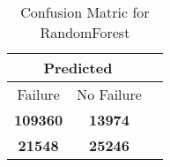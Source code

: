 \begin{table}[] 
\label{Table: Prediction Accuracy-DMDRandomForestOnlySunEKF-resetReflection-Reflection} 
\caption{Confusion Matric for RandomForest} 
\centering 
\begin{tabular} 
 {@{}ccc@{}} 
\toprule 
\multicolumn{2}{c}{\textbf{Predicted}}
 \\ \midrule 
\multicolumn{1}{|c|}{Failure} & 
\multicolumn{1}{c|}{No Failure}
 \\ \midrule 
\multicolumn{1}{|c|}{\color{green}\textbf{109360}} & 
\multicolumn{1}{c|}{\color{red}\textbf{13974}}
 \\ \midrule 
\multicolumn{1}{|c|}{\color{red}\textbf{21548}} & 
\multicolumn{1}{c|}{\color{green}\textbf{25246}}
 \\ \bottomrule 
\end{tabular} 
\end{table} 
